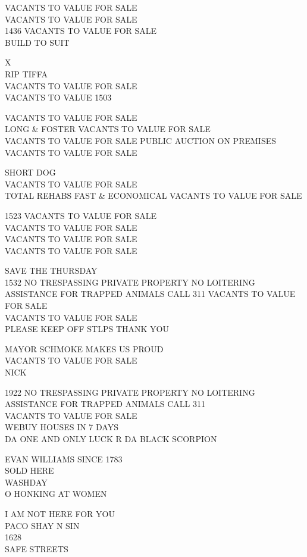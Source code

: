 \documentclass[10pt,letterpaper]{article}
\begin{document}
VACANTS TO VALUE FOR SALE\\
VACANTS TO VALUE FOR SALE\\
1436 VACANTS TO VALUE FOR SALE\\
BUILD TO SUIT

X\\
RIP TIFFA\\
VACANTS TO VALUE FOR SALE\\
VACANTS TO VALUE 1503

VACANTS TO VALUE FOR SALE\\
LONG \& FOSTER VACANTS TO VALUE FOR SALE\\
VACANTS TO VALUE FOR SALE PUBLIC AUCTION ON PREMISES\\
VACANTS TO VALUE FOR SALE

SHORT DOG\\
VACANTS TO VALUE FOR SALE\\
TOTAL REHABS FAST \& ECONOMICAL VACANTS TO VALUE FOR SALE

1523 VACANTS TO VALUE FOR SALE\\
VACANTS TO VALUE FOR SALE\\
VACANTS TO VALUE FOR SALE\\
VACANTS TO VALUE FOR SALE

SAVE THE THURSDAY\\
1532 NO TRESPASSING PRIVATE PROPERTY NO LOITERING ASSISTANCE FOR TRAPPED ANIMALS CALL 311 VACANTS TO VALUE FOR SALE\\
VACANTS TO VALUE FOR SALE\\
PLEASE KEEP OFF STLPS THANK YOU

MAYOR SCHMOKE MAKES US PROUD\\
VACANTS TO VALUE FOR SALE\\
NICK

1922 NO TRESPASSING PRIVATE PROPERTY NO LOITERING ASSISTANCE FOR TRAPPED ANIMALS CALL 311\\
VACANTS TO VALUE FOR SALE\\
WEBUY HOUSES IN 7 DAYS\\
DA ONE AND ONLY LUCK R DA BLACK SCORPION

EVAN WILLIAMS SINCE 1783\\
SOLD HERE\\
WASHDAY\\
O HONKING AT WOMEN

I AM NOT HERE FOR YOU\\
PACO SHAY N SIN\\
1628\\
SAFE STREETS
\end{document}
